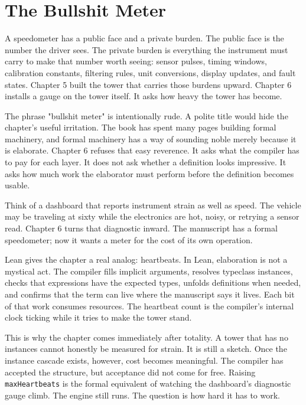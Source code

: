 \chapter{The Bullshit Meter}
\label{chap:bullshit-meter}


A speedometer has a public face and a private burden. The public face is the
number the driver sees. The private burden is everything the instrument must
carry to make that number worth seeing: sensor pulses, timing windows,
calibration constants, filtering rules, unit conversions, display updates, and
fault states. Chapter 5 built the tower that carries those burdens upward.
Chapter 6 installs a gauge on the tower itself. It asks how heavy the tower has
become.

The phrase "bullshit meter" is intentionally rude. A polite title would hide
the chapter's useful irritation. The book has spent many pages building formal
machinery, and formal machinery has a way of sounding noble merely because it
is elaborate. Chapter 6 refuses that easy reverence. It asks what the compiler
has to pay for each layer. It does not ask whether a definition looks
impressive. It asks how much work the elaborator must perform before the
definition becomes usable.

Think of a dashboard that reports instrument strain as well as speed. The
vehicle may be traveling at sixty while the electronics are hot, noisy, or
retrying a sensor read. Chapter 6 turns that diagnostic inward. The manuscript
has a formal speedometer; now it wants a meter for the cost of its own
operation.

Lean gives the chapter a real analog: heartbeats. In Lean, elaboration is not a
mystical act. The compiler fills implicit arguments, resolves typeclass
instances, checks that expressions have the expected types, unfolds definitions
when needed, and confirms that the term can live where the manuscript says it
lives. Each bit of that work consumes resources. The heartbeat count is the
compiler's internal clock ticking while it tries to make the tower stand.

This is why the chapter comes immediately after totality. A tower that has no
instances cannot honestly be measured for strain. It is still a sketch. Once
the instance cascade exists, however, cost becomes meaningful. The compiler has
accepted the structure, but acceptance did not come for free. Raising
\texttt{maxHeartbeats} is the formal equivalent of watching the dashboard's
diagnostic gauge climb. The engine still runs. The question is how hard it has
to work.

